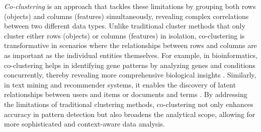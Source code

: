 \textit{Co-clustering}\cite{cheng2000BiclusteringExpressionData, kluger2003SpectralBiclusteringMicroarray, yan2017CoclusteringMultidimensionalBig} is an approach that tackles these limitations by grouping both rows (objects) and columns (features) simultaneously, revealing complex correlations between two different data types. Unlike traditional cluster methods \cite{zhang2023AdaptiveGraphConvolution, yuan2023JointNetworkTopology, wu2023EffectiveClusteringStructured} that only cluster either rows (objects) or columns (features) in isolation, co-clustering is transformative in scenarios where the relationships between rows and columns are as important as the individual entities themselves. For example, in bioinformatics, co-clustering helps in identifying gene patterns by analyzing genes and conditions concurrently, thereby revealing more comprehensive biological insights \cite{higham2007SpectralClusteringIts, kluger2003SpectralBiclusteringMicroarray, madeira2004BiclusteringAlgorithmsBiological, zhao2012BiclusteringAnalysisPattern, golchev2015BiclusteringAnalysisGene}. Similarly, in text mining and recommender systems, it enables the discovery of latent relationships between users and items or documents and terms \cite{busygin2008BiclusteringDataMining, dhillon2001CoclusteringDocumentsWords, dhillon2007WeightedGraphCuts, chen2023ParallelNonNegativeMatrix, bouchareb2019ModelBasedCoclustering}. By addressing the limitations of traditional clustering methods, co-clustering not only enhances accuracy in pattern detection but also broadens the analytical scope, allowing for more sophisticated and context-aware data analysis.

